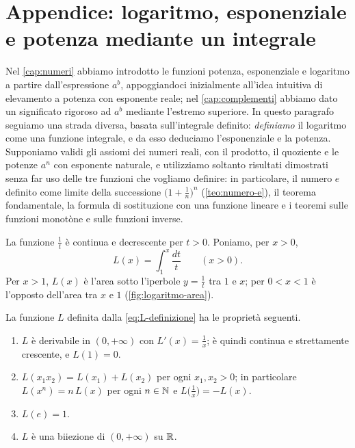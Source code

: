 \section{Appendice: logaritmo, esponenziale e potenza mediante un integrale}
\label{sec:logaritmo-integrale}

Nel \cref{cap:numeri} abbiamo introdotto le funzioni potenza, esponenziale e logaritmo a
partire dall'espressione $a^{b}$, appoggiandoci inizialmente all'idea intuitiva di
elevamento a potenza con esponente reale; nel \cref{cap:complementi} abbiamo dato un
significato rigoroso ad $a^{b}$ mediante l'estremo superiore. In questo paragrafo seguiamo
una strada diversa, basata sull'integrale definito: \emph{definiamo} il logaritmo come
una funzione integrale, e da esso deduciamo l'esponenziale e la potenza. Supponiamo
validi gli assiomi dei numeri reali, con il prodotto, il quoziente e le potenze $a^{n}$
con esponente naturale, e utilizziamo soltanto risultati dimostrati senza far uso delle
tre funzioni che vogliamo definire: in particolare, il numero $e$ definito come limite
della successione $\bigl(1+\frac1n\bigr)^{n}$ (\cref{teo:numero-e}), il teorema fondamentale, la
formula di sostituzione con una funzione lineare e i teoremi sulle funzioni monotòne e
sulle funzioni inverse.

La funzione $\frac1t$ è continua e decrescente per $t>0$. Poniamo, per $x>0$,
\begin{equation}\label{eq:L-definizione}
  L(x)=\int_{1}^{x}\frac{dt}t \qquad (x>0) .
\end{equation}
Per $x>1$, $L(x)$ è l'area sotto l'iperbole $y=\frac1t$ tra $1$ e $x$; per $0<x<1$ è l'opposto
dell'area tra $x$ e $1$ (\cref{fig:logaritmo-area}).

\begin{proposizione}\label{prop:L-proprieta}
La funzione $L$ definita dalla \eqref{eq:L-definizione} ha le proprietà seguenti.
\begin{enumerate}[label=\textup{(\alph*)}]
  \item $L$ è derivabile in $(0,+\infty)$ con $L'(x)=\frac1x$; è quindi continua e strettamente
  crescente, e $L(1)=0$.
  \item $L(x_{1}x_{2})=L(x_{1})+L(x_{2})$ per ogni $x_{1},x_{2}>0$; in particolare
  $L(x^{n})=n\,L(x)$ per ogni $n\in\mathbb{N}$ e $L\bigl(\frac1x\bigr)=-L(x)$.
  \item $L(e)=1$.
  \item $L$ è una biiezione di $(0,+\infty)$ su $\mathbb{R}$.
\end{enumerate}
\end{proposizione}

